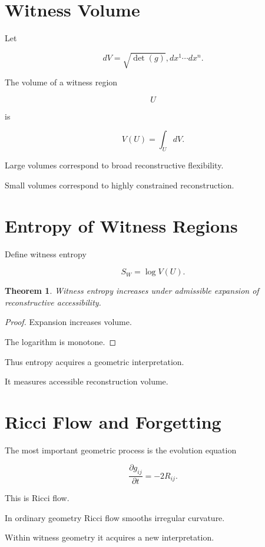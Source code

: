 \documentclass[12pt,oneside]{book}
\theoremstyle{plain} \newtheorem{theorem}{Theorem}[chapter] \newtheorem{lemma}[theorem]{Lemma} \newtheorem{proposition}[theorem]{Proposition} \newtheorem{corollary}[theorem]{Corollary}
\theoremstyle{definition} \newtheorem{definition}[theorem]{Definition} \newtheorem{axiom}[theorem]{Axiom} \newtheorem{construction}[theorem]{Construction}
\theoremstyle{remark} \newtheorem{remark}[theorem]{Remark} \newtheorem{example}[theorem]{Example}
\begin{document}
\section{Witness Volume}

Let

\[
dV
=
\sqrt{\det(g)}
,dx^1\cdots dx^n.
\]

The volume of a witness region

\[
U
\]

is

\[
V(U)
=
\int_U dV.
\]

Large volumes correspond to broad reconstructive flexibility.

Small volumes correspond to highly constrained reconstruction.

\section{Entropy of Witness Regions}

Define witness entropy

\[
S_W
=
\log V(U).
\]

\begin{theorem}

Witness entropy increases under admissible expansion of reconstructive accessibility.

\end{theorem}

\begin{proof}

Expansion increases volume.

The logarithm is monotone.

\end{proof}

Thus entropy acquires a geometric interpretation.

It measures accessible reconstruction volume.

\section{Ricci Flow and Forgetting}

The most important geometric process is the evolution equation

\[
\frac{\partial g_{ij}}{\partial t}
=
-2R_{ij}.
\]

This is Ricci flow.

In ordinary geometry Ricci flow smooths irregular curvature.

Within witness geometry it acquires a new interpretation.
\end{document}
